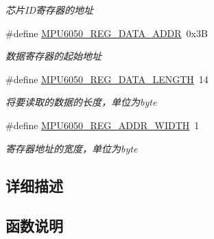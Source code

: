 \begin{DoxyCompactItemize}
\begin{DoxyCompactList}\small\item\em 芯片\+I\+D寄存器的地址 \end{DoxyCompactList}\item 
\#define \hyperlink{group__mpu6050__driver_ga0cb210a5e35606d81cbe9ac18fc58c66}{M\+P\+U6050\+\_\+\+R\+E\+G\+\_\+\+D\+A\+T\+A\+\_\+\+A\+D\+DR}~0x3B\hypertarget{group__mpu6050__driver_ga0cb210a5e35606d81cbe9ac18fc58c66}{}\label{group__mpu6050__driver_ga0cb210a5e35606d81cbe9ac18fc58c66}

\begin{DoxyCompactList}\small\item\em 数据寄存器的起始地址 \end{DoxyCompactList}\item 
\#define \hyperlink{group__mpu6050__driver_gabc34a5f0aa7ab3953ed9879d9583aa3b}{M\+P\+U6050\+\_\+\+R\+E\+G\+\_\+\+D\+A\+T\+A\+\_\+\+L\+E\+N\+G\+TH}~14\hypertarget{group__mpu6050__driver_gabc34a5f0aa7ab3953ed9879d9583aa3b}{}\label{group__mpu6050__driver_gabc34a5f0aa7ab3953ed9879d9583aa3b}

\begin{DoxyCompactList}\small\item\em 将要读取的数据的长度，单位为byte \end{DoxyCompactList}\item 
\#define \hyperlink{group__mpu6050__driver_ga158691fc91945a8fe2f198653e0b4c28}{M\+P\+U6050\+\_\+\+R\+E\+G\+\_\+\+A\+D\+D\+R\+\_\+\+W\+I\+D\+TH}~1\hypertarget{group__mpu6050__driver_ga158691fc91945a8fe2f198653e0b4c28}{}\label{group__mpu6050__driver_ga158691fc91945a8fe2f198653e0b4c28}

\begin{DoxyCompactList}\small\item\em 寄存器地址的宽度，单位为byte \end{DoxyCompactList}\end{DoxyCompactItemize}


\subsection{详细描述}


\subsection{函数说明}
